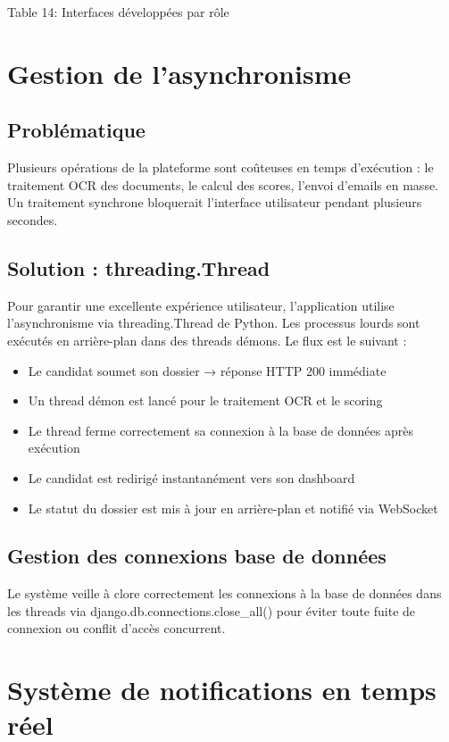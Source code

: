 Table 14: Interfaces développées par rôle

\section{Gestion de l'asynchronisme}

\subsection{Problématique}

Plusieurs opérations de la plateforme sont coûteuses en temps d'exécution : le traitement OCR des documents, le calcul des scores, l'envoi d'emails en masse. Un traitement synchrone bloquerait l'interface utilisateur pendant plusieurs secondes.

\subsection{Solution : threading.Thread}

Pour garantir une excellente expérience utilisateur, l'application utilise l'asynchronisme via threading.Thread de Python. Les processus lourds sont exécutés en arrière-plan dans des threads démons. Le flux est le suivant :

\begin{itemize}
\item Le candidat soumet son dossier → réponse HTTP 200 immédiate
\item Un thread démon est lancé pour le traitement OCR et le scoring
\item Le thread ferme correctement sa connexion à la base de données après exécution
\item Le candidat est redirigé instantanément vers son dashboard
\item Le statut du dossier est mis à jour en arrière-plan et notifié via WebSocket
\end{itemize}

\subsection{Gestion des connexions base de données}

Le système veille à clore correctement les connexions à la base de données dans les threads via django.db.connections.close\_all() pour éviter toute fuite de connexion ou conflit d'accès concurrent.

\section{Système de notifications en temps réel}

